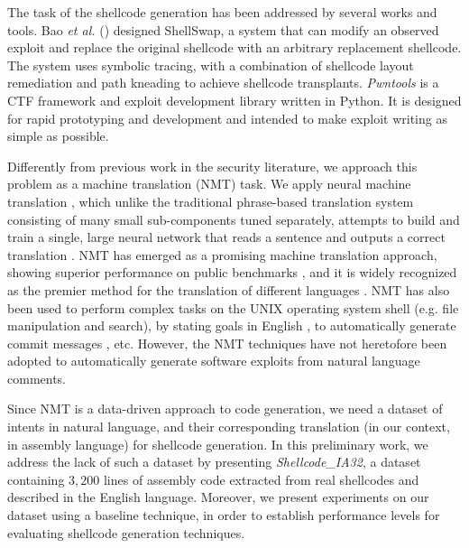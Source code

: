 \documentclass[11pt,a4paper]{article}
\newcommand{\datasetname}[1]{\emph{Shellcode\_IA32}}
\begin{document}
The task of the shellcode generation has been addressed by several works and tools. Bao \textit{et al.} (\citeyear{bao2017your}) designed ShellSwap, a system that can modify an observed exploit and replace the original shellcode with an arbitrary replacement shellcode. The system uses symbolic tracing, with a combination of shellcode layout remediation and path kneading to achieve shellcode transplants. 
\textit{Pwntools} \cite{pwntools} is a CTF framework and exploit development library written in Python. It is designed for rapid prototyping and development and intended to make exploit writing as simple as possible.


Differently from previous work in the security literature, we approach this problem as a machine translation (NMT) task. We apply neural machine translation \cite{goodfellow2016deep}, which unlike the traditional phrase-based translation system consisting of many small sub-components tuned separately, attempts to build and train a single, large neural network that reads a sentence and outputs a correct translation \cite{bahdanau2014neural}. NMT has emerged as a promising machine translation approach, showing superior performance on public benchmarks \cite{bojar2016findings}, and it is widely recognized as the premier method for the translation of different languages \cite{wu2016google}. 
NMT has also been used to perform complex tasks on the UNIX operating system shell \cite{lin2017program} (e.g. file manipulation and search), by stating goals in English \cite{lin-etal-2018-nl2bash}, to automatically generate commit messages \cite{liu2018neural}, etc. However, the NMT techniques have not heretofore been adopted to automatically generate software exploits from natural language comments. 


 

Since NMT is a data-driven approach to code generation, we need a dataset of intents in natural language, and their corresponding translation (in our context, in assembly language) for shellcode generation. 
In this preliminary work, we address the lack of such a dataset by presenting \datasetname{}, a dataset containing $3,200$ lines of assembly code extracted from real shellcodes and described in the English language. Moreover, we present experiments on our dataset using a baseline technique, in order to establish performance levels for evaluating shellcode generation techniques. 
\end{document}
